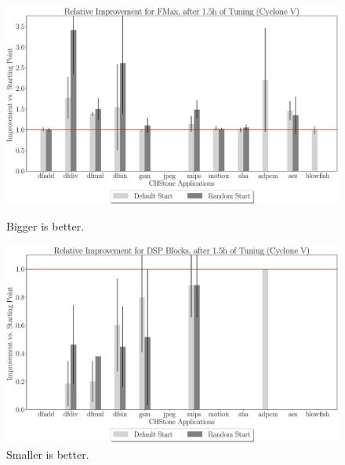 \documentclass[12pt, a4paper]{article}
\begin{document}
\begin{figure}[htpb]
    \centering
    \begin{minipage}{.48\textwidth}
        \centering
        \includegraphics[width=.8\textwidth]{rel_comp_fmax_5400_chstone_CycloneV}
        \caption{Bigger is better.}
    \end{minipage}%
    \begin{minipage}{.48\textwidth}
        \centering
        \includegraphics[width=.8\textwidth]{rel_comp_dsp_5400_chstone_CycloneV}
        \caption{Smaller is better.}
    \end{minipage}%


\end{figure}
\end{document}
